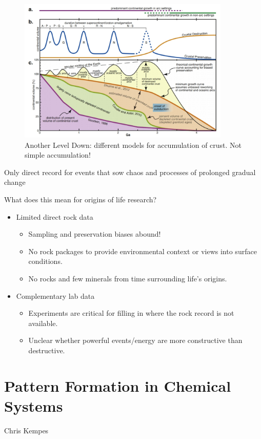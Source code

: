 \documentclass[]{article}
\begin{document}
\begin{figure}[H]
	\caption{Another Level Down: different models for accumulation of crust. Not simple accumulation!}\label{fig:AnotherLevelDown} 
	\includegraphics[width=0.9\textwidth]{AnotherLevelDown}
\end{figure}

Only direct record for events that sow chaos and processes of prolonged gradual change

What does this mean for origins of life research?
\begin{itemize}
	\item Limited direct rock data
	\begin{itemize}
		\item 	Sampling and preservation
		biases abound!
			\item No rock packages to
		provide environmental
		context or views into surface
		conditions.
		\item 	No rocks and few minerals
		from time surrounding life’s
		origins.
	\end{itemize}
	\item Complementary lab data
	\begin{itemize}
		\item Experiments are critical for
		filling in where the rock
		record is not available.
			\item Unclear whether powerful
		events/energy are more
		constructive than destructive.
	\end{itemize}
\end{itemize}
\section{Pattern Formation in Chemical Systems}
Chris Kempes
\end{document}

